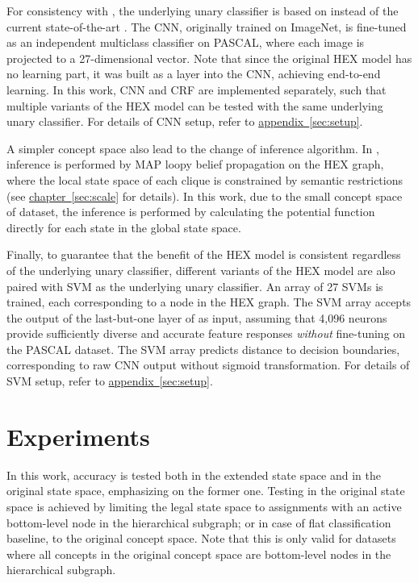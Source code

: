 \documentclass[11pt,a4paper]{book}
\begin{document}
For consistency with \cite{deng2014large}, the underlying unary classifier is based on \cite{krizhevsky2012imagenet} instead of the current state-of-the-art \cite{simonyan2014very}. The CNN, originally trained on ImageNet, is fine-tuned as an independent multiclass classifier on PASCAL, where each image is projected to a 27-dimensional vector. Note that since the original HEX model has no learning part, it was built as a layer into the CNN, achieving end-to-end learning. In this work, CNN and CRF are implemented separately, such that multiple variants of the HEX model can be tested with the same underlying unary classifier. For details of CNN setup, refer to \hyperref[sec:setup]{appendix~\ref{sec:setup}}.

A simpler concept space also lead to the change of inference algorithm. In \cite{deng2014large}, inference is performed by MAP loopy belief propagation on the HEX graph, where the local state space of each clique is constrained by semantic restrictions (see \hyperref[sec:scale]{chapter~\ref{sec:scale}} for details). In this work, due to the small concept space of dataset, the inference is performed by calculating the potential function directly for each state in the global state space.

Finally, to guarantee that the benefit of the HEX model is consistent regardless of the underlying unary classifier, different variants of the HEX model are also paired with SVM as the underlying unary classifier. An array of 27 SVMs is trained, each corresponding to a node in the HEX graph. The SVM array accepts the output of the last-but-one layer of \cite{krizhevsky2012imagenet} as input, assuming that 4,096 neurons provide sufficiently diverse and accurate feature responses \emph{without} fine-tuning on the PASCAL dataset. The SVM array predicts distance to decision boundaries, corresponding to raw CNN output without sigmoid transformation. For details of SVM setup, refer to \hyperref[sec:setup]{appendix~\ref{sec:setup}}.

\section{Experiments}
\label{sec:exp1}

In this work, accuracy is tested both in the extended state space and in the original state space, emphasizing on the former one. Testing in the original state space is achieved by limiting the legal state space to assignments with an active bottom-level node in the hierarchical subgraph; or in case of flat classification baseline, to the original concept space. Note that this is only valid for datasets where all concepts in the original concept space are bottom-level nodes in the hierarchical subgraph.
\end{document}
